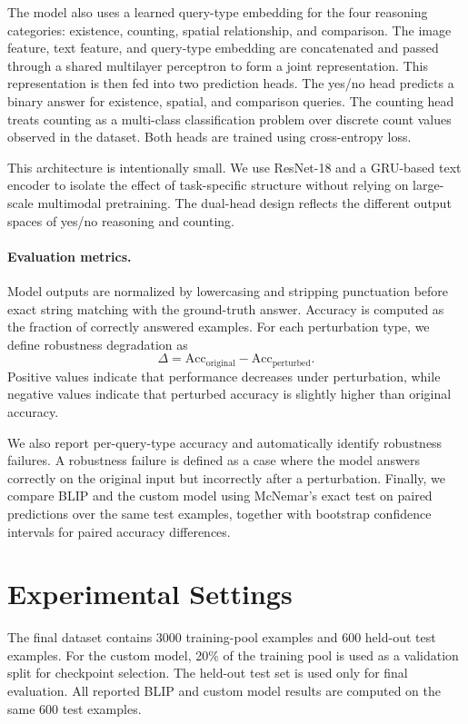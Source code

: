 The model also uses a learned query-type embedding for the four reasoning categories: existence, counting, spatial relationship, and comparison. The image feature, text feature, and query-type embedding are concatenated and passed through a shared multilayer perceptron to form a joint representation. This representation is then fed into two prediction heads. The yes/no head predicts a binary answer for existence, spatial, and comparison queries. The counting head treats counting as a multi-class classification problem over discrete count values observed in the dataset. Both heads are trained using cross-entropy loss.

This architecture is intentionally small. We use ResNet-18 and a GRU-based text encoder to isolate the effect of task-specific structure without relying on large-scale multimodal pretraining. The dual-head design reflects the different output spaces of yes/no reasoning and counting.

\paragraph{Evaluation metrics.}
Model outputs are normalized by lowercasing and stripping punctuation before exact string matching with the ground-truth answer. Accuracy is computed as the fraction of correctly answered examples. For each perturbation type, we define robustness degradation as
\[
\Delta = \mathrm{Acc}_{\mathrm{original}} - \mathrm{Acc}_{\mathrm{perturbed}}.
\]
Positive values indicate that performance decreases under perturbation, while negative values indicate that perturbed accuracy is slightly higher than original accuracy.

We also report per-query-type accuracy and automatically identify robustness failures. A robustness failure is defined as a case where the model answers correctly on the original input but incorrectly after a perturbation. Finally, we compare BLIP and the custom model using McNemar's exact test on paired predictions over the same test examples, together with bootstrap confidence intervals for paired accuracy differences.

\section{Experimental Settings}

The final dataset contains 3000 training-pool examples and 600 held-out test examples. For the custom model, 20\% of the training pool is used as a validation split for checkpoint selection. The held-out test set is used only for final evaluation. All reported BLIP and custom model results are computed on the same 600 test examples.

